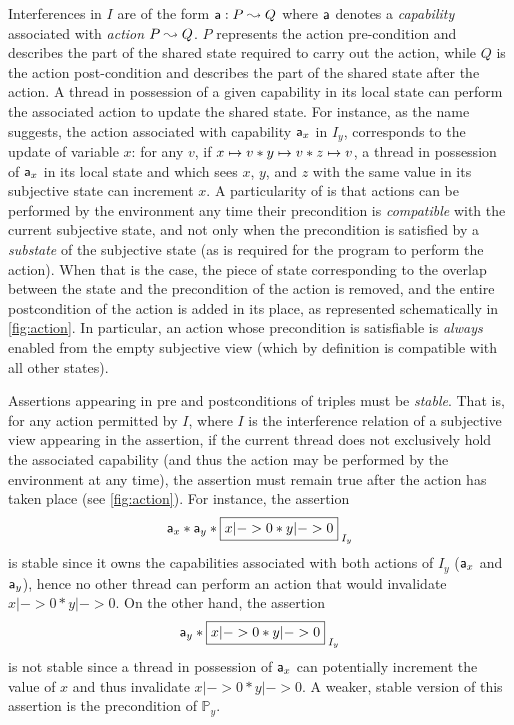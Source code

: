 Interferences in $I$ are of the form $\mathsf{a}: P \mathrel{\leadsto} Q$ where
$\mathsf{a}$ denotes a \emph{capability} associated with \emph{action}
$P \mathrel{\leadsto} Q$. $P$ represents the action pre-condition and describes the
part of the shared state required to carry out the action, while $Q$
is the action post-condition and describes the part of the shared
state after the action.  A thread in possession of a given capability
in its local state can perform the associated action to update the
shared state.  For instance, as the name suggests, the action
associated with capability $\mathsf{a}_x$ in $I_y$, corresponds to the
update of variable $x$: for any $v$, if $x \mapsto v * y \mapsto v *
z \mapsto v$, a thread in possession of $\mathsf{a}_x$ in its local
state and which sees $x$, $y$, and $z$ with the same value in its
subjective state can increment $x$.  A particularity of \colosl is
that actions can be performed by the environment any time their
precondition is \emph{compatible} with the current subjective state,
and not only when the precondition is satisfied by a \emph{substate}
of the subjective state (as is required for the program to perform the
action). When that is the case, the piece of state corresponding to
the overlap between the state and the precondition of the action is
removed, and the entire postcondition of the action is added in its
place, as represented schematically in \fig\ref{fig:action}.  In
particular, an action whose precondition is satisfiable is
\emph{always} enabled from the empty subjective view (which by
definition is compatible with all other states).

Assertions appearing in pre and postconditions of triples must be
\emph{stable}. That is, for any action permitted by $I$, where $I$ is
the interference relation of a subjective view appearing in the
assertion, if the current thread does not exclusively hold the
associated capability (and thus the action may be performed by the
environment at any time), the assertion must remain true after the
action has taken place (see \fig\ref{fig:action}). For instance, the
assertion
\[
\token a_x * \token a_y * \shared{x|->0 * y|->0}{I_y}
\]
is stable since it owns the capabilities associated with both actions
of $I_y$ ($\mathsf{a}_x$ and $\mathsf{a}_y$), hence no other thread can
perform an action that would invalidate $x|->0 * y|->0$. On the other
hand, the assertion
\[
\token a_y * \shared{x|->0 * y|->0}{I_y}
\]
is not stable since a thread in possession of $\mathsf{a}_x$ can
potentially increment the value of $x$ and thus invalidate $x|->0 *
y|->0$. A weaker, stable version of this assertion is the precondition
of $\mathbb P_y$.


